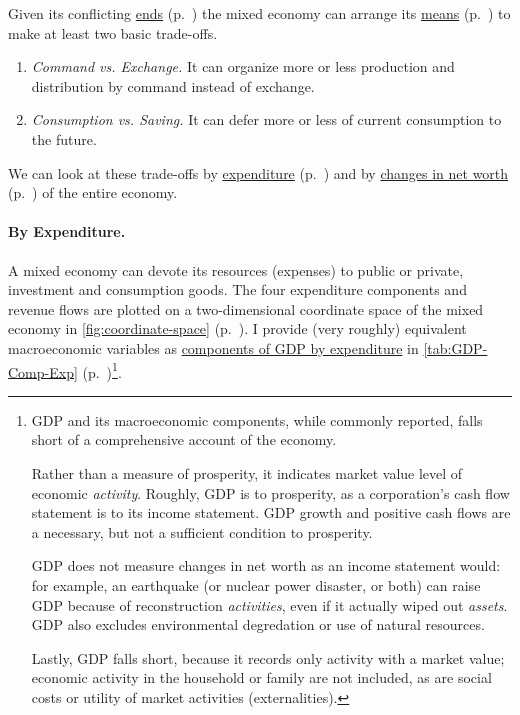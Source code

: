 
Given its conflicting \hyperref[sec:ends]{ends} (p.~\pageref{sec:ends}) the mixed economy can arrange its \hyperref[sec:means]{means} (p.~\pageref{sec:means}) to make at least two basic trade-offs. 
\begin{enumerate}
	\item \emph{Command vs. Exchange.} It can organize more or less production and distribution by command instead of exchange. 
	\item \emph{Consumption vs. Saving.} It can defer more or less of current consumption to the future. 
\end{enumerate}	
	
We can look at these trade-offs by \hyperref[sec:by-expenditure]{expenditure} (p.~\pageref{sec:by-expenditure}) and by \hyperref[sec:delta-net-worth]{changes in net worth} (p.~\pageref{sec:delta-net-worth}) of the entire economy. 

\paragraph[By Expenditure]{By Expenditure.}  \label{sec:by-expenditure}
A mixed economy can devote its resources (expenses) to public or private, investment and consumption goods. The four expenditure components and revenue flows are plotted on a two-dimensional coordinate space of the mixed economy in \autoref{fig:coordinate-space} (p.~\pageref{fig:coordinate-space}). I provide (very roughly) equivalent macroeconomic variables as \hyperref[tab:GDP-Comp-Exp]{components of GDP by expenditure} in \autoref{tab:GDP-Comp-Exp} (p.~\pageref{tab:GDP-Comp-Exp})\footnote{
	\gls{GDP} and its macroeconomic components, while commonly reported, falls short of a comprehensive account of the economy. 
	
	Rather than a measure of prosperity, it indicates market value level of economic \emph{activity}. Roughly, \gls{GDP} is to prosperity, as a corporation's cash flow statement is to its income statement. \gls{GDP} growth and positive cash flows are a necessary, but not a sufficient condition to prosperity. 
	
	\gls{GDP} does not measure changes in net worth as an income statement would: for example, an earthquake (or nuclear power disaster, or both) can raise \gls{GDP} because of reconstruction \emph{activities}, even if it actually wiped out \emph{assets}. \gls{GDP} also excludes environmental degredation or use of natural resources.
	
	Lastly, \gls{GDP} falls short, because it records only activity with a market value; economic activity in the household or family are not included, as are social costs or utility of market activities (externalities).}.
	
